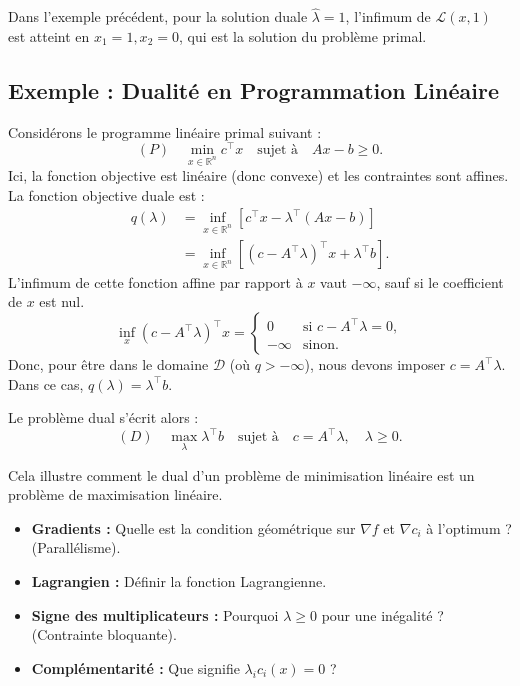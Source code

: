 \begin{remarque}
    Dans l'exemple précédent, pour la solution duale $\hat{\lambda} = 1$, l'infimum de $\mathcal{L}(x, 1)$ est atteint en $x_1 = 1, x_2 = 0$, qui est la solution du problème primal.
\end{remarque}

\subsection{Exemple : Dualité en Programmation Linéaire}

Considérons le programme linéaire primal suivant :
\begin{equation}
    (P) \quad \min_{x \in \mathbb{R}^n} c^\top x \quad \text{sujet à} \quad Ax - b \geq 0.
\end{equation}
Ici, la fonction objective est linéaire (donc convexe) et les contraintes sont affines. La fonction objective duale est :
\begin{align}
    q(\lambda) &= \inf_{x \in \mathbb{R}^n} \left[ c^\top x - \lambda^\top (Ax - b) \right] \\
    &= \inf_{x \in \mathbb{R}^n} \left[ (c - A^\top \lambda)^\top x + \lambda^\top b \right].
\end{align}
L'infimum de cette fonction affine par rapport à $x$ vaut $-\infty$, sauf si le coefficient de $x$ est nul.
\begin{equation}
    \inf_x (c - A^\top \lambda)^\top x = \begin{cases} 0 & \text{si } c - A^\top \lambda = 0, \\ -\infty & \text{sinon.} \end{cases}
\end{equation}
Donc, pour être dans le domaine $\mathcal{D}$ (où $q > -\infty$), nous devons imposer $c = A^\top \lambda$. Dans ce cas, $q(\lambda) = \lambda^\top b$.

Le problème dual s'écrit alors :
\begin{equation}
    (D) \quad \max_{\lambda} \lambda^\top b \quad \text{sujet à} \quad c = A^\top \lambda, \quad \lambda \geq 0.
\end{equation}

Cela illustre comment le dual d'un problème de minimisation linéaire est un problème de maximisation linéaire.

\bigskip
\begin{checkpoint}
\begin{itemize}
    \item \textbf{Gradients :} Quelle est la condition géométrique sur $\nabla f$ et $\nabla c_i$ à l'optimum ? (Parallélisme).
    \item \textbf{Lagrangien :} Définir la fonction Lagrangienne.
    \item \textbf{Signe des multiplicateurs :} Pourquoi $\lambda \ge 0$ pour une inégalité ? (Contrainte bloquante).
    \item \textbf{Complémentarité :} Que signifie $\lambda_i c_i(x) = 0$ ?
\end{itemize}
\end{checkpoint}

